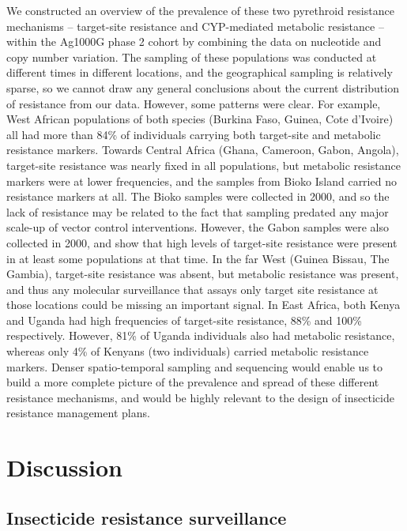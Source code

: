 \documentclass[a4paper,11pt,abstracton,hidelinks]{scrartcl}
\begin{document}
We constructed an overview of the prevalence of these two pyrethroid resistance mechanisms -- target-site resistance and CYP-mediated metabolic resistance -- within the Ag1000G phase 2 cohort by combining the data on nucleotide and copy number variation.
%
The sampling of these populations was conducted at different times in different locations, and the geographical sampling is relatively sparse, so we cannot draw any general conclusions about the current distribution of resistance from our data.
%
However, some patterns were clear.
%
For example, West African populations of both species (Burkina Faso, Guinea, Cote d'Ivoire) all had more than 84\% of individuals carrying both target-site and metabolic resistance markers.
%
Towards Central Africa (Ghana, Cameroon, Gabon, Angola), target-site resistance was nearly fixed in all populations, but metabolic resistance markers were at lower frequencies, and the samples from Bioko Island carried no resistance markers at all.
%
The Bioko samples were collected in 2000, and so the lack of resistance may be related to the fact that sampling predated any major scale-up of vector control interventions.
%
However, the Gabon samples were also collected in 2000, and show that high levels of target-site resistance were present in at least some populations at that time.
%
In the far West (Guinea Bissau, The Gambia), target-site resistance was absent, but metabolic resistance was present, and thus any molecular surveillance that assays only target site resistance at those locations could be missing an important signal.
%
In East Africa, both Kenya and Uganda had high frequencies of target-site resistance, 88\% and 100\% respectively.
%
However, 81\% of Uganda individuals also had metabolic resistance, whereas only 4\% of Kenyans (two individuals) carried metabolic resistance markers.
%
Denser spatio-temporal sampling and sequencing would enable us to build a more complete picture of the prevalence and spread of these different resistance mechanisms, and would be highly relevant to the design of insecticide resistance management plans.



\section*{Discussion}


\subsection*{Insecticide resistance surveillance}
\end{document}
